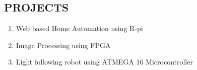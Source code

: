 \documentclass[line, margin]{res}
\begin{document}
\begin{resume}
\section{\bf PROJECTS}
\begin{enumerate}
	\item Web based Home Automation using R-pi
	\item Image Processing using FPGA
	\item Light following robot using ATMEGA 16 Microcontroller
\end{enumerate}

\end{resume}
\end{document}
